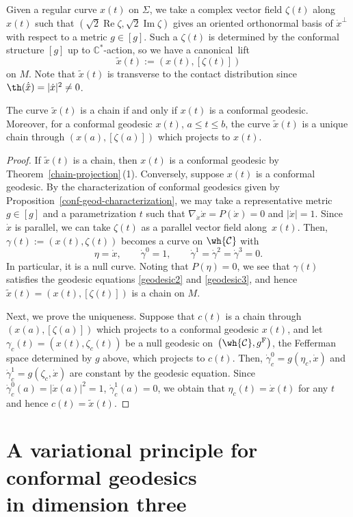 Given a regular curve $x(t)$ on $\Sigma$, we take a complex vector field $\zeta(t)$ along $x(t)$ such that $(\sqrt{2}\operatorname{Re}\zeta, \sqrt{2}\operatorname{Im}\zeta)$ gives an oriented orthonormal basis of $\dot x^\perp$ with respect to a metric ${g\in[g]}$. Such a $\zeta(t)$ is determined by the conformal structure $[g]$ up to $\mathbb{C}^*$-action, so we have a canonical~lift
\[
\tilde x(t):=(x(t), [\zeta(t)])
\]
on $M$. Note that $\tilde x(t)$ is transverse to the contact distribution since
$\th(\dot{\tilde x})=|\dot x|^2\neq 0$.
\begin{Theorem} \label{canonical-lift}
The curve $\tilde x(t)$ is a chain if and only if $x(t)$ is a conformal geodesic. Moreover, for a conformal geodesic $x(t)$, $a\le t\le b$, the curve $\tilde x(t)$ is a unique chain through $(x(a), [\zeta(a)])$ which projects to $x(t)$.
\end{Theorem}
\begin{proof}
If $\tilde x(t)$ is a chain, then $x(t)$ is a conformal geodesic by Theorem~\ref{chain-projection}\,(1). Conversely, suppose $x(t)$ is a conformal geodesic. By the characterization of conformal geodesics given by Proposition~\ref{conf-geod-characterization}, we may take a representative metric $g\in[g]$ and a parametrization $t$ such that $\nabla_{\dot x}\dot x=P(\dot x)=0$ and $|\dot x|=1$. Since $\dot x$ is parallel, we can take
$\zeta(t)$ as a parallel vector field along~$x(t)$.
Then, $\gamma(t):=(x(t), \zeta(t))$ becomes a curve on $\wh{\mathcal{C}}$ with
\[
\eta=\dot x, \qquad \dot\gamma^0=1, \qquad \dot\gamma^1=\dot\gamma^2=\dot\gamma^3=0.
\]
In particular, it is a null curve. Noting that $P(\eta)=0$, we see that $\gamma(t)$ satisfies the geodesic equations \eqref{geodesic2} and \eqref{geodesic3}, and hence $\tilde x(t)=(x(t), [\zeta(t)])$ is a chain on $M$.

Next, we prove the uniqueness. Suppose that $c (t)$ is a chain through $(x(a), [\zeta(a)])$ which projects to a conformal geodesic $x(t)$, and let $\gamma_c(t)=(x(t), \zeta_c(t))$ be a null geodesic on~${\bigl(\wh{\mathcal{C}}, g^{\mathrm{F}}\bigr)}$, the Fefferman space determined by $g$ above, which projects to $c(t)$. Then, $\dot\gamma_c^0=g(\eta_c, \dot x)$ and $\dot\gamma_c^1=g(\zeta_c, \dot x)$ are constant by the geodesic equation. Since $\dot\gamma_c^0(a)=|\dot x(a)|^2=1$, $\dot\gamma_c^1(a)=0$, we obtain that $\eta_c(t)=\dot x(t)$ for any $t$ and hence $c(t)=\tilde x(t)$.
\end{proof}

\section[A variational principle for conformal geodesics in dimension three]{A variational principle for conformal geodesics\\ in dimension three}\label{variational-principle}

